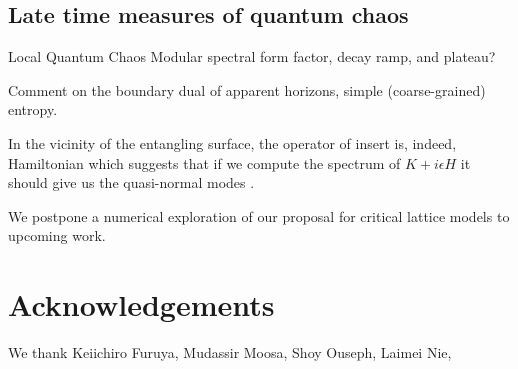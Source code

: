 \documentclass[a4paper,11pt]{article}
\theoremstyle{definition}
\begin{document}
\subsection{Late time measures of quantum chaos}
Local Quantum Chaos
Modular spectral form factor, decay ramp, and plateau?

Comment on the boundary dual of apparent horizons, simple (coarse-grained) entropy.

In the vicinity of the entangling surface, the operator of insert is, indeed, Hamiltonian which suggests that if we compute the spectrum of $K+i\epsilon H$ it should give us the quasi-normal modes \cite{maldacenapaper}.


We postpone a numerical exploration of our proposal for critical lattice models to upcoming work.

\section*{Acknowledgements}
We thank Keiichiro Furuya, Mudassir Moosa, Shoy Ouseph, Laimei Nie, 


\appendix

\end{document}
